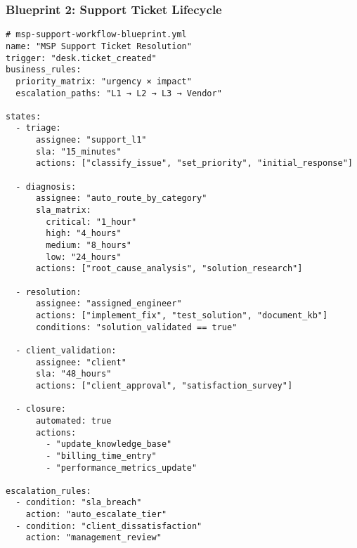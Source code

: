 \subsubsection{Blueprint 2: Support Ticket Lifecycle}
\begin{verbatim}
# msp-support-workflow-blueprint.yml
name: "MSP Support Ticket Resolution"
trigger: "desk.ticket_created"
business_rules:
  priority_matrix: "urgency × impact"
  escalation_paths: "L1 → L2 → L3 → Vendor"
  
states:
  - triage:
      assignee: "support_l1"
      sla: "15_minutes"
      actions: ["classify_issue", "set_priority", "initial_response"]
      
  - diagnosis:
      assignee: "auto_route_by_category" 
      sla_matrix:
        critical: "1_hour"
        high: "4_hours"
        medium: "8_hours"
        low: "24_hours"
      actions: ["root_cause_analysis", "solution_research"]
      
  - resolution:
      assignee: "assigned_engineer"
      actions: ["implement_fix", "test_solution", "document_kb"]
      conditions: "solution_validated == true"
      
  - client_validation:
      assignee: "client"
      sla: "48_hours"
      actions: ["client_approval", "satisfaction_survey"]
      
  - closure:
      automated: true
      actions:
        - "update_knowledge_base"
        - "billing_time_entry"
        - "performance_metrics_update"

escalation_rules:
  - condition: "sla_breach"
    action: "auto_escalate_tier"
  - condition: "client_dissatisfaction"
    action: "management_review"
\end{verbatim}


